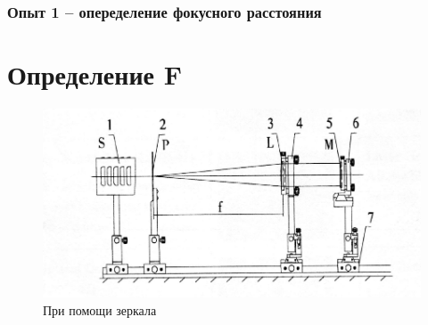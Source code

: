 \documentclass[10pt,pdf,hyperref={unicode}]{beamer}
\begin{document}
	\begin{frame}
\frametitle{Опыт 1 -- опеределение фокусного расстояния} 
\section{Определение F}



\begin{figure}[H]
	\centering
	\includegraphics[width=0.7\linewidth]{1}
	\caption{ При помощи зеркала
}
	\label{fig:1_1}
\end{figure}
\end{frame}
\end{document}
